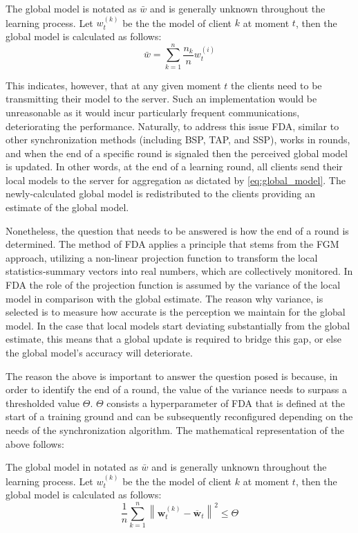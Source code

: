 The global model is notated as $\bar{w}$ and is generally unknown throughout the learning process. Let $w_t^{(k)}$ be the the model of client $k$ at moment $t$,
then the global model is calculated as follows:
\begin{equation}
    \bar{w} =  \sum_{k=1}^{n} \frac{n_k}{n}w_t^{(i)}
    \label{eq:global_model}
\end{equation}

This indicates, however, that at any given moment $t$ the clients need to be transmitting their model to the server. Such an implementation
would be unreasonable as it would incur particularly frequent communications, deteriorating the performance. Naturally, to address this issue
FDA, similar to other synchronization methods (including BSP, TAP, and SSP), works in rounds, and when the end of a specific round is signaled
then the perceived global model is updated. In other words, at the end of a learning round, all clients send their local models to the server
for aggregation as dictated by \cref{eq:global_model}. The newly-calculated global model is redistributed to the clients providing an estimate of
the global model.

Nonetheless, the question that needs to be answered is how the end of a round is determined. The method of FDA applies a principle that stems
from the FGM approach, utilizing a non-linear projection function to transform the local statistics-summary vectors into real numbers, which are
collectively monitored. In FDA the role of the projection function is assumed by the variance of the local model in comparison with the global estimate.
The reason why variance, is selected is to measure how accurate is the perception we maintain for the global model. In the case that local models start deviating substantially
from the global estimate, this means that a global update is required to bridge this gap, or else the global model's accuracy will deteriorate.

The reason the above is important to answer the question posed is because, in order to identify the end of a round, the value of the variance
needs to surpass a thresholded value $\Theta$. $\Theta$ consists a hyperparameter of FDA that is defined at the start of a training ground and
can be subsequently reconfigured depending on the needs of the synchronization algorithm. The mathematical representation of the above follows:

The global model in notated as $\bar{w}$ and is generally unknown throughout the learning process. Let $w_t^{(k)}$ be the the model of client $k$ at moment $t$,
then the global model is calculated as follows:
\begin{equation}
    \frac{1}{n} \sum_{k=1}^{n} \left\| \mathbf{w}_t^{(k)} - \overline{\mathbf{w}}_t \right\|^2 \leq \Theta
    \label{eq:rtc}
\end{equation}

